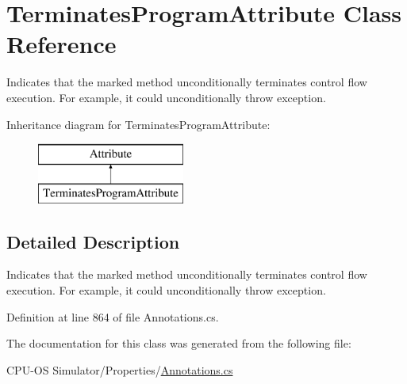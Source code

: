 \hypertarget{class_terminates_program_attribute}{}\section{Terminates\+Program\+Attribute Class Reference}
\label{class_terminates_program_attribute}


Indicates that the marked method unconditionally terminates control flow execution. For example, it could unconditionally throw exception.  


Inheritance diagram for Terminates\+Program\+Attribute\+:\begin{figure}[H]
\begin{center}
\leavevmode
\includegraphics[height=2.000000cm]{class_terminates_program_attribute}
\end{center}
\end{figure}


\subsection{Detailed Description}
Indicates that the marked method unconditionally terminates control flow execution. For example, it could unconditionally throw exception. 



Definition at line 864 of file Annotations.\+cs.



The documentation for this class was generated from the following file\+:\begin{DoxyCompactItemize}
\item 
C\+P\+U-\/\+O\+S Simulator/\+Properties/\hyperlink{_annotations_8cs}{Annotations.\+cs}\end{DoxyCompactItemize}
